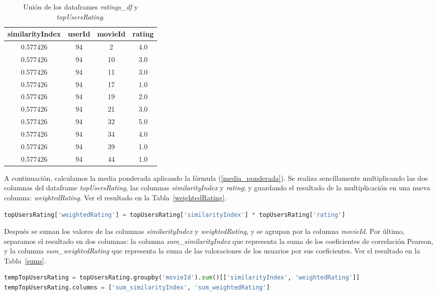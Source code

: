 \documentclass{uimppracticas}
\begin{document}
\begin{table}[H]
	\centering
	\begin{tabular}{cccc}
		\toprule
		similarityIndex &  userId &  movieId &  rating \\
		\midrule
		0.577426 &      94 &        2 &     4.0 \\
		0.577426 &      94 &       10 &     3.0 \\
		0.577426 &      94 &       11 &     3.0 \\
		0.577426 &      94 &       17 &     1.0 \\
		0.577426 &      94 &       19 &     2.0 \\
		0.577426 &      94 &       21 &     3.0 \\
		0.577426 &      94 &       32 &     5.0 \\
		0.577426 &      94 &       34 &     4.0 \\
		0.577426 &      94 &       39 &     1.0 \\
		0.577426 &      94 &       44 &     1.0 \\
		\bottomrule
	\end{tabular}
	\caption{Unión de los dataframes \textit{ratings\_df} y \textit{topUsersRating}.}
	\label{ratings_similares}
\end{table}

A continuación, calculamos la media ponderada aplicando la fórmula (\ref{media_ponderada}). Se realiza sencillamente multiplicando las dos columnas del dataframe \textit{topUsersRating}, las columnas \textit{similarityIndex} y \textit{rating}; y guardando el resultado de la multiplicación en una nueva columna: \textit{weightedRating}. Ver el resultado en la Tabla~\ref{weightedRating}.

\begin{lstlisting}[language=python, basicstyle=\small]
topUsersRating['weightedRating'] = topUsersRating['similarityIndex'] * topUsersRating['rating']
\end{lstlisting} 

Después se suman los valores de las columnas \textit{similarityIndex} y \textit{weightedRating}, y se agrupan por la columna \textit{movieId}. Por último, separamos el resultado en dos columnas: la columna \textit{sum\_similarityIndex} que representa la suma de los coeficientes de correlación Pearson, y la columna \textit{sum\_weightedRating} que representa la suma de las valoraciones de los usuarios por sus coeficientes. Ver el resultado en la Tabla~\ref{sums}.

\begin{lstlisting}[language=python, basicstyle=\small]
tempTopUsersRating = topUsersRating.groupby('movieId').sum()[['similarityIndex', 'weightedRating']]
tempTopUsersRating.columns = ['sum_similarityIndex', 'sum_weightedRating']
\end{lstlisting} 
\end{document}
